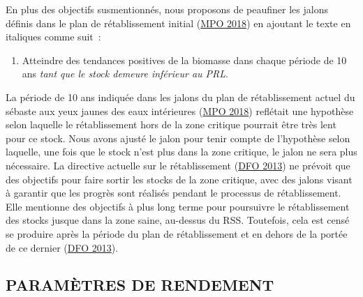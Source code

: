 \documentclass[french,11pt]{book}
\begin{document}
En plus des objectifs susmentionnés, nous proposons de peaufiner les jalons définis dans le plan de rétablissement initial (\protect\hyperlink{ref-ifmp2018}{MPO 2018}) en ajoutant le texte en italiques comme suit~:
\begin{enumerate}
\def\labelenumi{\arabic{enumi}.}
\setcounter{enumi}{5}

\item
  Atteindre des tendances positives de la biomasse dans chaque période de 10 ans \emph{tant que le stock demeure inférieur au PRL}.
\end{enumerate}
La période de 10 ans indiquée dans les jalons du plan de rétablissement actuel du sébaste aux yeux jaunes des eaux intérieures (\protect\hyperlink{ref-ifmp2018}{MPO 2018}) reflétait une hypothèse selon laquelle le rétablissement hors de la zone critique pourrait être très lent pour ce stock. Nous avons ajusté le jalon pour tenir compte de l'hypothèse selon laquelle, une fois que le stock n'est plus dans la zone critique, le jalon ne sera plus nécessaire. La directive actuelle sur le rétablissement (\protect\hyperlink{ref-dfo2013}{DFO 2013}) ne prévoit que des objectifs pour faire sortir les stocks de la zone critique, avec des jalons visant à garantir que les progrès sont réalisés pendant le processus de rétablissement. Elle mentionne des objectifs à plus long terme pour poursuivre le rétablissement des stocks jusque dans la zone saine, au-dessus du RSS. Toutefois, cela est censé se produire après la période du plan de rétablissement et en dehors de la portée de ce dernier (\protect\hyperlink{ref-dfo2013}{DFO 2013}).

\hypertarget{sec:objectives-metrics-pm}{%
\subsection{PARAMÈTRES DE RENDEMENT}\label{sec:objectives-metrics-pm}}
\end{document}
